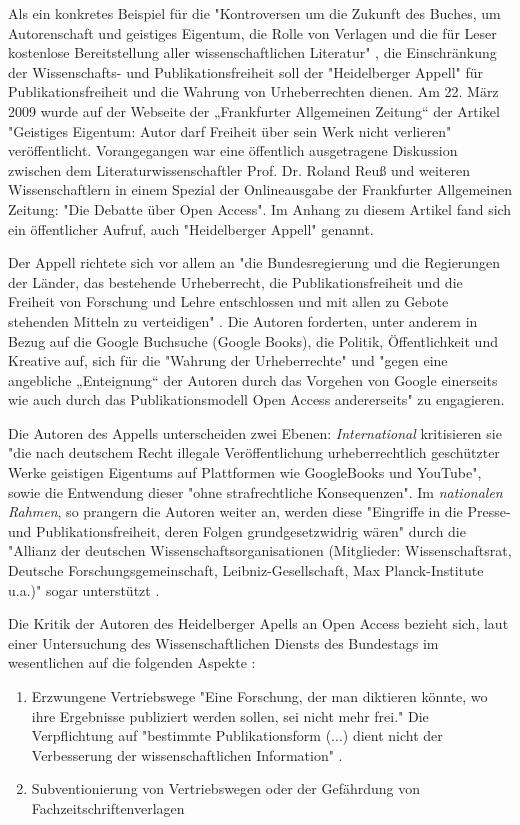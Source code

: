 Als ein konkretes Beispiel für die "Kontroversen um die Zukunft des Buches, um Autorenschaft und geistiges Eigentum, die Rolle von Verlagen und die für Leser kostenlose Bereitstellung aller wissenschaftlichen Literatur" \cite{hagner_2015_sache_buches}, die Einschränkung der Wissenschafts- und Publikationsfreiheit soll der "Heidelberger Appell" für Publikationsfreiheit und die Wahrung von Urheberrechten dienen. Am 22. März 2009 wurde auf der Webseite der „Frankfurter Allgemeinen Zeitung“ der Artikel "Geistiges Eigentum: Autor darf Freiheit über sein Werk nicht verlieren" \cite{faz_heidelberger_apell_2009} veröffentlicht. Vorangegangen war eine öffentlich ausgetragene Diskussion zwischen dem Literaturwissenschaftler Prof. Dr. Roland Reuß und weiteren Wissenschaftlern in einem Spezial der Onlineausgabe der Frankfurter Allgemeinen Zeitung: "Die Debatte über Open Access". Im Anhang zu diesem Artikel fand sich ein öffentlicher Aufruf, auch "Heidelberger Appell" genannt.

Der Appell richtete sich vor allem an "die Bundesregierung und die Regierungen der Länder, das bestehende Urheberrecht, die Publikationsfreiheit und die Freiheit von Forschung und Lehre entschlossen und mit allen zu Gebote stehenden Mitteln zu verteidigen" \cite{ITK_2009}. Die Autoren forderten, unter anderem in Bezug auf die Google Buchsuche (Google Books), die Politik, Öffentlichkeit und Kreative auf, sich für die "Wahrung der Urheberrechte" und "gegen eine angebliche „Enteignung“ der Autoren durch das Vorgehen von Google einerseits wie auch durch das Publikationsmodell Open Access andererseits" \cite{WD_bundestag_2009} zu engagieren.

Die Autoren des Appells unterscheiden zwei Ebenen: \textit{International} kritisieren sie "die nach deutschem Recht illegale Veröffentlichung urheberrechtlich geschützter Werke geistigen Eigentums auf Plattformen wie GoogleBooks und YouTube", sowie die Entwendung dieser "ohne strafrechtliche Konsequenzen". Im \textit{nationalen Rahmen}, so prangern die Autoren weiter an, werden diese "Eingriffe in die Presse- und Publikationsfreiheit, deren Folgen grundgesetzwidrig wären" durch die "Allianz der deutschen Wissenschaftsorganisationen (Mitglieder: Wissenschaftsrat, Deutsche Forschungsgemeinschaft, Leibniz-Gesellschaft, Max Planck-Institute u.a.)" sogar unterstützt \cite{ITK_2009}.

Die Kritik der Autoren des Heidelberger Apells an Open Access bezieht sich, laut einer Untersuchung des Wissenschaftlichen Diensts des Bundestags im wesentlichen auf die folgenden Aspekte \cite{WD_bundestag_2009}:
\begin{enumerate}
\item Erzwungene Vertriebswege
"Eine Forschung, der man diktieren könnte, wo ihre Ergebnisse publiziert werden sollen, sei nicht mehr frei." Die Verpflichtung auf "bestimmte Publikationsform (...) dient nicht der Verbesserung der wissenschaftlichen Information" \cite{ITK_2009}.
\item Subventionierung von Vertriebswegen oder der Gefährdung von Fachzeitschriftenverlagen \cite{ITK_2009}
\end{enumerate}

